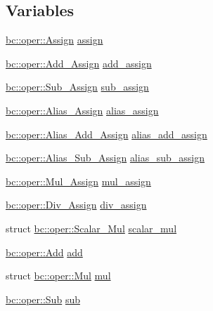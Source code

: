 \subsection*{Variables}
\begin{DoxyCompactItemize}
\item 
\hyperlink{structbc_1_1oper_1_1Assign}{bc\+::oper\+::\+Assign} \hyperlink{namespacebc_1_1oper_a0182ff2349a83f5d60df9228c81f4c86}{assign}
\item 
\hyperlink{structbc_1_1oper_1_1Add__Assign}{bc\+::oper\+::\+Add\+\_\+\+Assign} \hyperlink{namespacebc_1_1oper_a3630ef463dc9cd3b2d81a721c54b3de0}{add\+\_\+assign}
\item 
\hyperlink{structbc_1_1oper_1_1Sub__Assign}{bc\+::oper\+::\+Sub\+\_\+\+Assign} \hyperlink{namespacebc_1_1oper_ada648e2c665e51826f9994439416fd35}{sub\+\_\+assign}
\item 
\hyperlink{structbc_1_1oper_1_1Alias__Assign}{bc\+::oper\+::\+Alias\+\_\+\+Assign} \hyperlink{namespacebc_1_1oper_aa3845643e60ff3ef51e8e6086dc95da5}{alias\+\_\+assign}
\item 
\hyperlink{structbc_1_1oper_1_1Alias__Add__Assign}{bc\+::oper\+::\+Alias\+\_\+\+Add\+\_\+\+Assign} \hyperlink{namespacebc_1_1oper_a068551b415b7681632991fa236684223}{alias\+\_\+add\+\_\+assign}
\item 
\hyperlink{structbc_1_1oper_1_1Alias__Sub__Assign}{bc\+::oper\+::\+Alias\+\_\+\+Sub\+\_\+\+Assign} \hyperlink{namespacebc_1_1oper_aab8c10f0ec9df51deb1e55093958cff6}{alias\+\_\+sub\+\_\+assign}
\item 
\hyperlink{structbc_1_1oper_1_1Mul__Assign}{bc\+::oper\+::\+Mul\+\_\+\+Assign} \hyperlink{namespacebc_1_1oper_a8c70c1a663341d06aa30bccdb8e0a33f}{mul\+\_\+assign}
\item 
\hyperlink{structbc_1_1oper_1_1Div__Assign}{bc\+::oper\+::\+Div\+\_\+\+Assign} \hyperlink{namespacebc_1_1oper_a68691708c95bf8edf5b3f36760c7cc7b}{div\+\_\+assign}
\item 
struct \hyperlink{structbc_1_1oper_1_1Scalar__Mul}{bc\+::oper\+::\+Scalar\+\_\+\+Mul} \hyperlink{namespacebc_1_1oper_a88023efbb639886b4b6b1a6ec5686633}{scalar\+\_\+mul}
\item 
\hyperlink{structbc_1_1oper_1_1Add}{bc\+::oper\+::\+Add} \hyperlink{namespacebc_1_1oper_ae9f350183a664bc9c8209185a379d9df}{add}
\item 
struct \hyperlink{structbc_1_1oper_1_1Mul}{bc\+::oper\+::\+Mul} \hyperlink{namespacebc_1_1oper_a3b668db0194c37001f9c9a0183bfc0a7}{mul}
\item 
\hyperlink{structbc_1_1oper_1_1Sub}{bc\+::oper\+::\+Sub} \hyperlink{namespacebc_1_1oper_adb76fb39747577e1be7e372917f2953d}{sub}

\end{DoxyCompactItemize}

